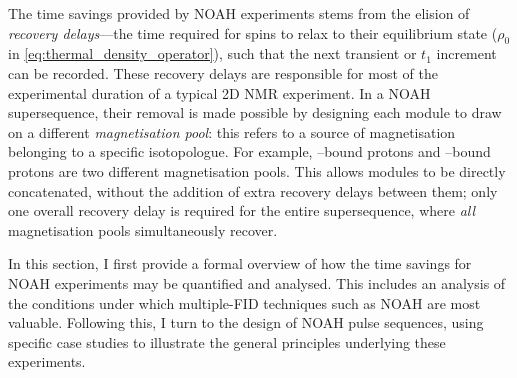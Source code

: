 The time savings provided by NOAH experiments stems from the elision of \textit{recovery delays}---the time required for spins to relax to their equilibrium state ($\rho_0$ in \cref{eq:thermal_density_operator}), such that the next transient or $t_1$ increment can be recorded.
These recovery delays are responsible for most of the experimental duration of a typical 2D NMR experiment.
In a NOAH supersequence, their removal is made possible by designing each module to draw on a different \textit{magnetisation pool}: this refers to a source of magnetisation belonging to a specific isotopologue.
For example, \carbon{}--bound protons and \carbont{}--bound protons are two different magnetisation pools.
This allows modules to be directly concatenated, without the addition of extra recovery delays between them; only one overall recovery delay is required for the entire supersequence, where \textit{all} magnetisation pools simultaneously recover.

In this section, I first provide a formal overview of how the time savings for NOAH experiments may be quantified and analysed.
This includes an analysis of the conditions under which multiple-FID techniques such as NOAH are most valuable.
Following this, I turn to the design of NOAH pulse sequences, using specific case studies to illustrate the general principles underlying these experiments.




